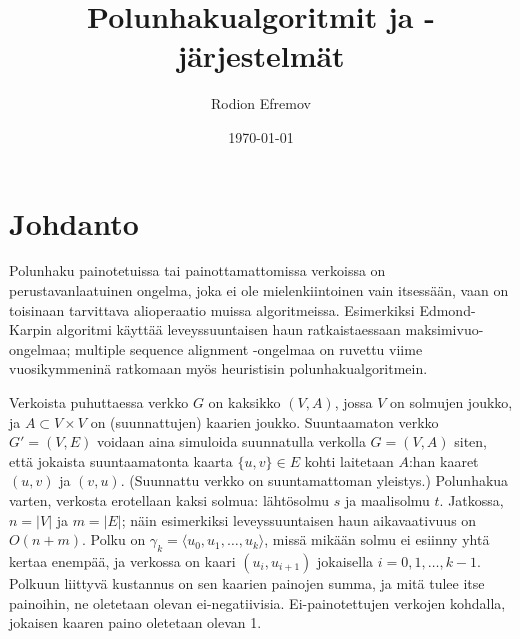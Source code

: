 \documentclass[finnish]{tktltiki2}
\title{Polunhakualgoritmit ja -järjestelmät}
\author{Rodion Efremov}
\date{\today}
\theoremstyle{definition}
\theoremstyle{remark}
\begin{document}

\frontmatter      %

\maketitle        %
\makeabstract     %

\tableofcontents  %


\mainmatter       %

\section{Johdanto}
Polunhaku painotetuissa tai painottamattomissa verkoissa on perustavanlaatuinen ongelma, joka ei ole mielenkiintoinen vain itsessään, vaan on toisinaan tarvittava alioperaatio muissa algoritmeissa. Esimerkiksi Edmond-Karpin algoritmi käyttää leveyssuuntaisen haun ratkaistaessaan maksimivuo-ongelmaa; multiple sequence alignment -ongelmaa on ruvettu viime vuosikymmeninä ratkomaan myös heuristisin polunhakualgoritmein.

Verkoista puhuttaessa verkko $G$ on kaksikko $(V, A)$, jossa $V$ on solmujen joukko, ja $A \subset V \times V$ on (suunnattujen) kaarien joukko. Suuntaamaton verkko $G' = (V, E)$ voidaan aina simuloida suunnatulla verkolla $G= (V, A)$ siten, että jokaista suuntaamatonta kaarta $\{ u, v \} \in E$ kohti laitetaan $A$:han kaaret $(u, v)$ ja $(v, u)$. (Suunnattu verkko on suuntamattoman yleistys.) Polunhakua varten, verkosta erotellaan kaksi solmua: lähtösolmu $s$ ja maalisolmu $t$. Jatkossa, $n = |V|$ ja $m = |E|$; näin esimerkiksi leveyssuuntaisen haun aikavaativuus on $O(n + m)$. Polku on $\gamma_k = \langle u_0, u_1, \dots, u_k \rangle$, missä mikään solmu ei esiinny yhtä kertaa enempää, ja verkossa on kaari $(u_i, u_{i + 1})$ jokaisella $i = 0, 1, \dots, k - 1$. Polkuun liittyvä kustannus on sen kaarien painojen summa, ja mitä tulee itse painoihin, ne oletetaan olevan ei-negatiivisia. Ei-painotettujen verkojen kohdalla, jokaisen kaaren paino oletetaan olevan 1.

%
%
% 
%
\end{document}
